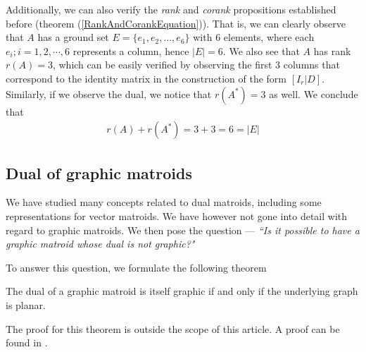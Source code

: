 \begin{exmp}
    Additionally, we can also verify the \textit{rank} and \textit{corank} propositions established before (theorem (\ref{RankAndCorankEquation})). That is, we can clearly observe that $A$ has a ground set $E=\{e_1, e_2, \dots, e_6\}$ with $6$ elements, where each $e_i; i =1,2, \cdots,6$ represents a column, hence $|E|=6$. We also see that $A$ has rank $r(A)=3$, which can be easily verified by observing the first $3$ columns that correspond to the identity matrix in the construction of the form $[I_r|D]$. Similarly, if we observe the dual, we notice that $r(A^*)=3$ as well. We conclude that 
    \begin{align*}
    r(A)+r(A^*)= 3 + 3 = 6 = |E|
    \end{align*}
\end{exmp}

%

\subsection{Dual of graphic matroids}
We have studied many concepts related to dual matroids, including some representations for vector matroids. We have however not gone into detail with regard to graphic matroids. We then pose the question --- \textit{``Is it possible to have a graphic matroid whose dual is not graphic?"}

To answer this question, we formulate the following theorem

\begin{theorem}
    The dual of a graphic matroid is itself graphic if and only if the underlying graph is planar.
\end{theorem}

The proof for this theorem is outside the scope of this article. A proof can be found in \cite[section 2.4]{oxley1}.

